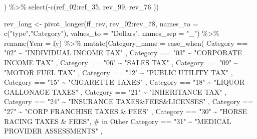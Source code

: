\documentclass[
  letterpaper,
  DIV=11,
  numbers=noendperiod]{scrreport}
\newenvironment{Shaded}{\begin{snugshade}}{\end{snugshade}}
\newcommand{\AttributeTok}[1]{\textcolor[rgb]{0.40,0.45,0.13}{#1}}
\newcommand{\CommentTok}[1]{\textcolor[rgb]{0.37,0.37,0.37}{#1}}
\newcommand{\FunctionTok}[1]{\textcolor[rgb]{0.28,0.35,0.67}{#1}}
\newcommand{\NormalTok}[1]{\textcolor[rgb]{0.00,0.23,0.31}{#1}}
\newcommand{\OtherTok}[1]{\textcolor[rgb]{0.00,0.23,0.31}{#1}}
\newcommand{\SpecialCharTok}[1]{\textcolor[rgb]{0.37,0.37,0.37}{#1}}
\newcommand{\StringTok}[1]{\textcolor[rgb]{0.13,0.47,0.30}{#1}}
\begin{document}
\begin{Shaded}
\begin{Highlighting}[]
\NormalTok{         ) }\SpecialCharTok{\%\textgreater{}\%} 
  \FunctionTok{select}\NormalTok{(}\SpecialCharTok{{-}}\FunctionTok{c}\NormalTok{(ref\_02}\SpecialCharTok{:}\NormalTok{ref\_35, rev\_99, rev\_76}
\NormalTok{            ))}

\NormalTok{rev\_long }\OtherTok{\textless{}{-}} \FunctionTok{pivot\_longer}\NormalTok{(ff\_rev, rev\_02}\SpecialCharTok{:}\NormalTok{rev\_78, }\AttributeTok{names\_to =} \FunctionTok{c}\NormalTok{(}\StringTok{"type"}\NormalTok{,}\StringTok{"Category"}\NormalTok{), }\AttributeTok{values\_to =} \StringTok{"Dollars"}\NormalTok{, }\AttributeTok{names\_sep =} \StringTok{"\_"}\NormalTok{) }\SpecialCharTok{\%\textgreater{}\%} 
  \FunctionTok{rename}\NormalTok{(}\AttributeTok{Year =}\NormalTok{ fy) }\SpecialCharTok{\%\textgreater{}\%}
  \FunctionTok{mutate}\NormalTok{(}\AttributeTok{Category\_name =} \FunctionTok{case\_when}\NormalTok{(}
\NormalTok{    Category }\SpecialCharTok{==} \StringTok{"02"} \SpecialCharTok{\textasciitilde{}} \StringTok{"INDIVIDUAL INCOME TAX"}\NormalTok{ ,}
\NormalTok{    Category }\SpecialCharTok{==} \StringTok{"03"} \SpecialCharTok{\textasciitilde{}} \StringTok{"CORPORATE INCOME TAX"}\NormalTok{ ,}
\NormalTok{    Category }\SpecialCharTok{==} \StringTok{"06"} \SpecialCharTok{\textasciitilde{}} \StringTok{"SALES TAX"}\NormalTok{ ,}
\NormalTok{    Category }\SpecialCharTok{==} \StringTok{"09"} \SpecialCharTok{\textasciitilde{}} \StringTok{"MOTOR FUEL TAX"}\NormalTok{ ,}
\NormalTok{    Category }\SpecialCharTok{==} \StringTok{"12"} \SpecialCharTok{\textasciitilde{}} \StringTok{"PUBLIC UTILITY TAX"}\NormalTok{ ,}
\NormalTok{    Category }\SpecialCharTok{==} \StringTok{"15"} \SpecialCharTok{\textasciitilde{}} \StringTok{"CIGARETTE TAXES"}\NormalTok{ ,}
\NormalTok{    Category }\SpecialCharTok{==} \StringTok{"18"} \SpecialCharTok{\textasciitilde{}} \StringTok{"LIQUOR GALLONAGE TAXES"}\NormalTok{ ,}
\NormalTok{    Category }\SpecialCharTok{==} \StringTok{"21"} \SpecialCharTok{\textasciitilde{}} \StringTok{"INHERITANCE TAX"}\NormalTok{ ,}
\NormalTok{    Category }\SpecialCharTok{==} \StringTok{"24"} \SpecialCharTok{\textasciitilde{}} \StringTok{"INSURANCE TAXES\&FEES\&LICENSES"}\NormalTok{ ,}
\NormalTok{    Category }\SpecialCharTok{==} \StringTok{"27"} \SpecialCharTok{\textasciitilde{}} \StringTok{"CORP FRANCHISE TAXES \& FEES"}\NormalTok{ ,}
\NormalTok{    Category }\SpecialCharTok{==} \StringTok{"30"} \SpecialCharTok{\textasciitilde{}} \StringTok{"HORSE RACING TAXES \& FEES"}\NormalTok{,  }\CommentTok{\# in Other}
\NormalTok{    Category }\SpecialCharTok{==} \StringTok{"31"} \SpecialCharTok{\textasciitilde{}} \StringTok{"MEDICAL PROVIDER ASSESSMENTS"}\NormalTok{ ,}

\end{Highlighting}
\end{Shaded}
\end{document}
